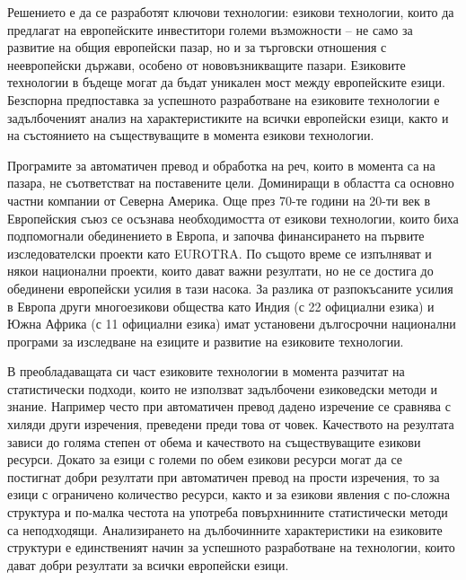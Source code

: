 \begin{multicols}{2}
Решението е да се разработят ключови технологии: езикови технологии, които да предлагат на европейските инвеститори големи възможности – не само за развитие на общия европейски пазар, но и за търговски отношения с неевропейски държави, особено от нововъзникващите пазари. Езиковите технологии в бъдеще могат да бъдат уникален мост между европейските езици. Безспорна предпоставка за успешното разработване на езиковите технологии е задълбоченият анализ на характеристиките на всички европейски езици, както и на състоянието на съществуващите в момента езикови технологии.

Програмите за автоматичен превод и обработка на реч, които в момента са на пазара, не съответстват на поставените цели. Доминиращи в областта са основно частни компании от Северна Америка. Още през 70-те години на 20-ти век в Европейския съюз се осъзнава необходимостта от езикови технологии, които биха подпомогнали обединението в Европа, и започва финансирането на първите изследователски проекти като EUROTRA. По същото време се изпълняват и някои национални проекти, които дават важни резултати, но не се достига до обединени европейски усилия в тази насока. За разлика от разпокъсаните усилия в Европа други многоезикови общества като Индия (с 22 официални езика) и Южна Африка (с 11 официални езика) имат установени дългосрочни национални програми за изследване на езиците и развитие на езиковите технологии.

В преобладаващата си част езиковите технологии в момента разчитат на статистически подходи, които не използват задълбочени езиковедски методи и знание. Например често при автоматичен превод дадено изречение се сравнява с хиляди други изречения, преведени преди това от човек. Качеството на резултата зависи до голяма степен от обема и качеството на съществуващите езикови ресурси. Докато за езици с големи по обем езикови ресурси могат да се постигнат добри резултати при автоматичен превод на прости изречения, то за езици с ограничено количество ресурси, както и за езикови явления с по-сложна структура и по-малка честота на употреба повърхнинните статистически методи са неподходящи. Анализирането на дълбочинните характеристики на езиковите структури е единственият начин за успешното разработване на технологии, които дават добри резултати за всички европейски езици.



\end{multicols}
